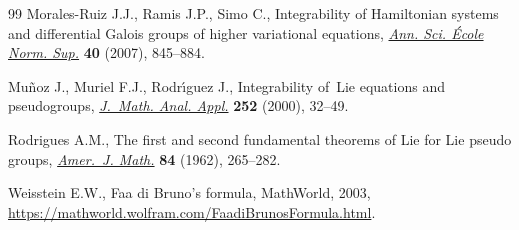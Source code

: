 \begin{thebibliography}{99}
Morales-Ruiz J.J., Ramis J.P., Simo C., Integrability of {H}amiltonian systems
 and differential {G}alois groups of higher variational equations,
 \href{https://doi.org/10.1016/j.ansens.2007.09.002}{\textit{Ann. Sci.
 \'{E}cole Norm. Sup.}} \textbf{40} (2007), 845--884.

Mu\~noz J., Muriel F.J., Rodr\'{\i}guez J., Integrability of~{L}ie equations
 and pseudogroups,
 \href{https://doi.org/10.1006/jmaa.2000.6805}{\textit{J.~Math. Anal. Appl.}}
 \textbf{252} (2000), 32--49.

Rodrigues A.M., The first and second fundamental theorems of {L}ie for {L}ie
 pseudo groups, \href{https://doi.org/10.2307/2372762}{\textit{Amer.~J.
 Math.}} \textbf{84} (1962), 265--282.

Weisstein E.W., Faa di {B}runo's formula, {M}athWorld, 2003,
 \url{https://mathworld.wolfram.com/FaadiBrunosFormula.html}.

\end{thebibliography}
